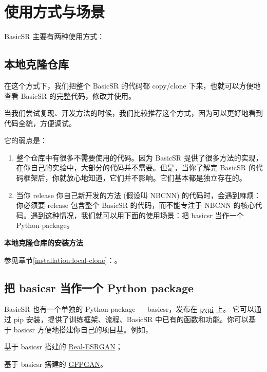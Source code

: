 \documentclass[../main.tex]{subfiles}
\begin{document}
\section{使用方式与场景}

BasicSR 主要有两种使用方式：

\subsection{本地克隆仓库}

在这个方式下，我们把整个 BasicSR 的代码都 copy/clone 下来，也就可以方便地查看 BasicSR 的完整代码，修改并使用。

当我们尝试复现、开发方法的时候，我们比较推荐这个方式，因为可以更好地看到代码全貌，方便调试。

它的弱点是：

\begin{enumerate}
	\item 整个仓库中有很多不需要使用的代码。因为 BasicSR 提供了很多方法的实现，在你自己的实验中，大部分的代码并不需要。但是，当你了解完 BasicSR 的代码框架后，你就放心地知道，它们并不影响。它们基本都是独立存在的。
	\item 当你 release 你自己新开发的方法 (假设叫 NBCNN) 的代码时，会遇到麻烦：你必须要 release 包含整个 BasicSR 的代码，而不能专注于 NBCNN 的核心代码。遇到这种情况，我们就可以用下面的使用场景：把 basicsr 当作一个 Python package。
\end{enumerate}

\begin{note} %
	\textbf{本地克隆仓库的安装方法}
		
	参见章节\ref{installation:local-clone}：。
\end{note}


\subsection{把 basicsr 当作一个 Python package}

BasicSR 也有一个单独的 Python package --- basicsr，发布在 \href{https://pypi.org/project/basicsr}{pypi} 上。
它可以通过 pip 安装，提供了训练框架、流程、BasicSR 中已有的函数和功能。你可以基于 basicsr 方便地搭建你自己的项目基。例如，

\centerline{基于 basicsr 搭建的 \href{https://github.com/xinntao/Real-ESRGAN}{Real-ESRGAN}；}
\centerline{基于 basicsr 搭建的 \href{https://github.com/TencentARC/GFPGAN}{GFPGAN}。}
\end{document}
